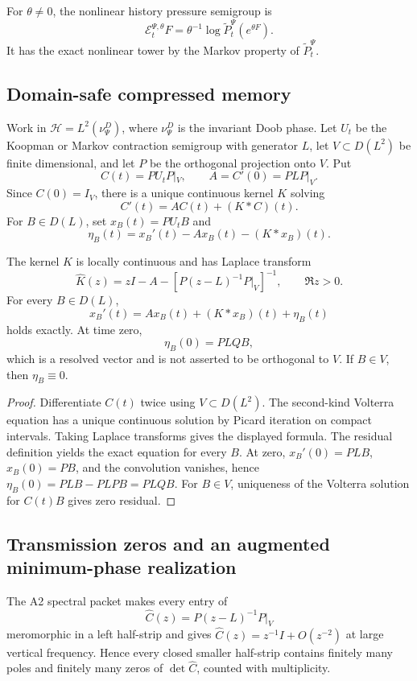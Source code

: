 For \(\theta\ne0\), the nonlinear history pressure semigroup is
\[
\mathcal E_t^{\Psi,\theta}F
=\theta^{-1}\log\widetilde P_t^\Psi(e^{\theta F}).
\]
It has the exact nonlinear tower by the Markov property of
\(\widetilde P_t^\Psi\).

\subsection{Domain-safe compressed memory}

Work in \(\mathcal H=L^2(\nu_\Psi^D)\), where \(\nu_\Psi^D\) is the invariant
Doob phase.  Let \(U_t\) be the Koopman or Markov contraction semigroup with
generator \(L\), let \(V\subset D(L^2)\) be finite dimensional, and let
\(P\) be the orthogonal projection onto \(V\).  Put
\[
C(t)=PU_tP|_V,
\qquad A=C'(0)=PLP|_V.
\]
Since \(C(0)=I_V\), there is a unique continuous kernel \(K\) solving
\[
C'(t)=AC(t)+(K*C)(t).
\]
For \(B\in D(L)\), set \(x_B(t)=PU_tB\) and
\[
\eta_B(t)=x_B'(t)-Ax_B(t)-(K*x_B)(t).
\]

\begin{theorem}
\label{thm:r6-a4-volterra}
The kernel \(K\) is locally continuous and has Laplace transform
\[
\widehat K(z)=zI-A-[P(z-L)^{-1}P|_V]^{-1},
\qquad \Re z>0.
\]
For every \(B\in D(L)\),
\[
x_B'(t)=Ax_B(t)+(K*x_B)(t)+\eta_B(t)
\]
holds exactly.  At time zero,
\[
\eta_B(0)=PLQB,
\]
which is a resolved vector and is not asserted to be orthogonal to \(V\).
If \(B\in V\), then \(\eta_B\equiv0\).
\end{theorem}

\begin{proof}
Differentiate \(C(t)\) twice using \(V\subset D(L^2)\).  The second-kind
Volterra equation has a unique continuous solution by Picard iteration on
compact intervals.  Taking Laplace transforms gives the displayed formula.
The residual definition yields the exact equation for every \(B\).  At zero,
\(x_B'(0)=PLB\), \(x_B(0)=PB\), and the convolution vanishes, hence
\(\eta_B(0)=PLB-PLPB=PLQB\).  For \(B\in V\), uniqueness of the Volterra
solution for \(C(t)B\) gives zero residual.
\end{proof}

\subsection{Transmission zeros and an augmented minimum-phase realization}

The A2 spectral packet makes every entry of
\[
\widehat C(z)=P(z-L)^{-1}P|_V
\]
meromorphic in a left half-strip and gives
\(\widehat C(z)=z^{-1}I+O(z^{-2})\) at large vertical frequency.  Hence every
closed smaller half-strip contains finitely many poles and finitely many zeros
of \(\det\widehat C\), counted with multiplicity.

